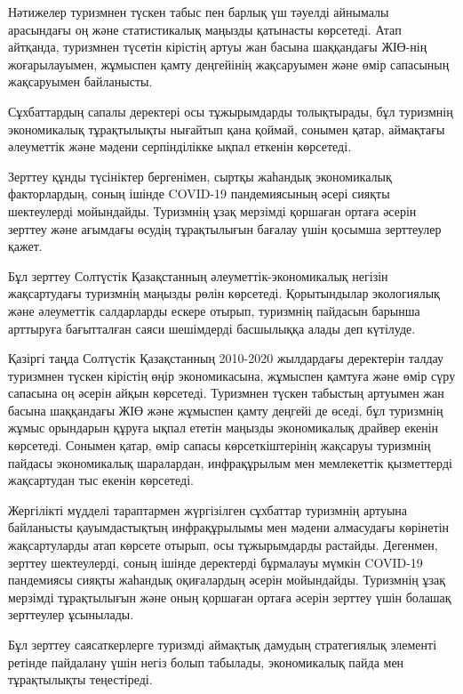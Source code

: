 \begin{multicols}{2}
Нәтижелер туризмнен түскен табыс пен барлық үш тәуелді айнымалы
арасындағы оң және статистикалық маңызды қатынасты көрсетеді. Атап
айтқанда, туризмнен түсетін кірістің артуы жан басына шаққандағы ЖІӨ-нің
жоғарылауымен, жұмыспен қамту деңгейінің жақсаруымен және өмір сапасының
жақсаруымен байланысты.

Сұхбаттардың сапалы деректері осы тұжырымдарды толықтырады, бұл
туризмнің экономикалық тұрақтылықты нығайтып қана қоймай, сонымен қатар,
аймақтағы әлеуметтік және мәдени серпінділікке ықпал еткенін көрсетеді.

Зерттеу құнды түсініктер бергенімен, сыртқы жаһандық экономикалық
факторлардың, соның ішінде COVID-19 пандемиясының әсері сияқты
шектеулерді мойындайды. Туризмнің ұзақ мерзімді қоршаған ортаға әсерін
зерттеу және ағымдағы өсудің тұрақтылығын бағалау үшін қосымша
зерттеулер қажет.

Бұл зерттеу Солтүстік Қазақстанның әлеуметтік-экономикалық негізін
жақсартудағы туризмнің маңызды рөлін көрсетеді. Қорытындылар экологиялық
және әлеуметтік салдарларды ескере отырып, туризмнің пайдасын барынша
арттыруға бағытталған саяси шешімдерді басшылыққа алады деп күтілуде.

Қазіргі таңда Солтүстік Қазақстанның 2010-2020 жылдардағы деректерін
талдау туризмнен түскен кірістің өңір экономикасына, жұмыспен қамтуға
және өмір сүру сапасына оң әсерін айқын көрсетеді. Туризмнен түскен
табыстың артуымен жан басына шаққандағы ЖІӨ және жұмыспен қамту деңгейі
де өседі, бұл туризмнің жұмыс орындарын құруға ықпал ететін маңызды
экономикалық драйвер екенін көрсетеді. Сонымен қатар, өмір сапасы
көрсеткіштерінің жақсаруы туризмнің пайдасы экономикалық шаралардан,
инфрақұрылым мен мемлекеттік қызметтерді жақсартудан тыс екенін
көрсетеді.

Жергілікті мүдделі тараптармен жүргізілген сұхбаттар туризмнің артуына
байланысты қауымдастықтың инфрақұрылымы мен мәдени алмасудағы көрінетін
жақсартуларды атап көрсете отырып, осы тұжырымдарды растайды. Дегенмен,
зерттеу шектеулерді, соның ішінде деректерді бұрмалауы мүмкін COVID-19
пандемиясы сияқты жаһандық оқиғалардың әсерін мойындайды. Туризмнің ұзақ
мерзімді тұрақтылығын және оның қоршаған ортаға әсерін зерттеу үшін
болашақ зерттеулер ұсынылады.

Бұл зерттеу саясаткерлерге туризмді аймақтық дамудың стратегиялық
элементі ретінде пайдалану үшін негіз болып табылады, экономикалық пайда
мен тұрақтылықты теңестіреді.


\end{multicols}
